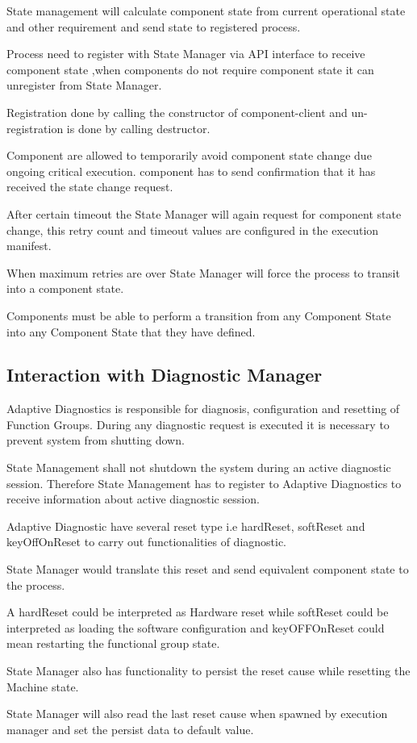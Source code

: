 \begin{DoxyItemize}
\item State management will calculate component state from current operational state and other requirement and send state to registered process.
\item Process need to register with State Manager via A\+PI interface to receive component state ,when components do not require component state it can unregister from State Manager.
\item Registration done by calling the constructor of component-\/client and un-\/registration is done by calling destructor.
\item Component are allowed to temporarily avoid component state change due ongoing critical execution. component has to send confirmation that it has received the state change request.
\item After certain timeout the State Manager will again request for component state change, this retry count and timeout values are configured in the execution manifest.
\item When maximum retries are over State Manager will force the process to transit into a component state.
\item Components must be able to perform a transition from any Component State into any Component State that they have defined. 
\end{DoxyItemize}

\subsection*{Interaction with Diagnostic Manager}


\begin{DoxyItemize}
\item Adaptive Diagnostics is responsible for diagnosis, configuration and resetting of Function Groups. During any diagnostic request is executed it is necessary to prevent system from shutting down.
\item State Management shall not shutdown the system during an active diagnostic session. Therefore State Management has to register to Adaptive Diagnostics to receive information about active diagnostic session.
\item Adaptive Diagnostic have several reset type i.\+e hard\+Reset, soft\+Reset and key\+Off\+On\+Reset to carry out functionalities of diagnostic.
\item State Manager would translate this reset and send equivalent component state to the process.
\item A hard\+Reset could be interpreted as Hardware reset while soft\+Reset could be interpreted as loading the software configuration and key\+O\+F\+F\+On\+Reset could mean restarting the functional group state.
\item State Manager also has functionality to persist the reset cause while resetting the Machine state.
\item State Manager will also read the last reset cause when spawned by execution manager and set the persist data to default value.
\end{DoxyItemize}

